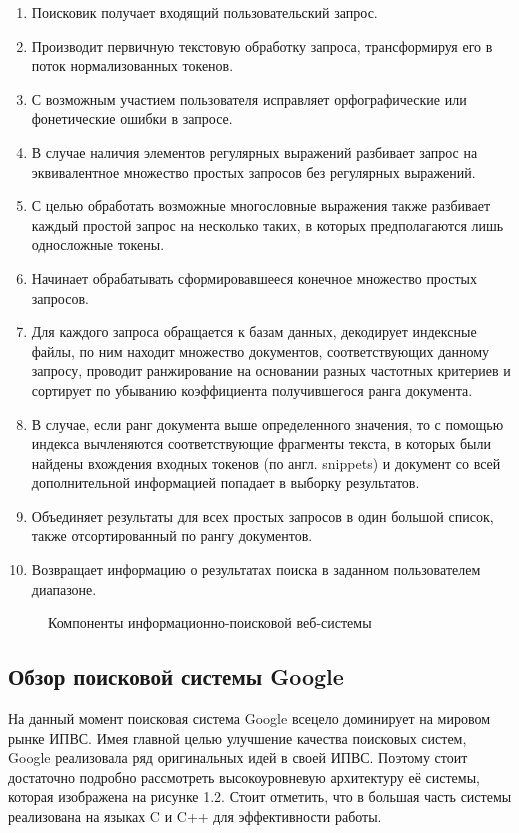 \begin{itemize}
\begin{enumerate}
\item Поисковик получает входящий пользовательский запрос.
\item Производит первичную текстовую обработку запроса, трансформируя его в поток нормализованных токенов.
\item С возможным участием пользователя исправляет орфографические или фонетические ошибки в запросе.
\item В случае наличия элементов регулярных выражений разбивает запрос на эквивалентное множество простых запросов без регулярных выражений.
\item С целью обработать возможные многословные выражения также разбивает каждый простой запрос на несколько таких, в которых предполагаются лишь односложные токены.
\item Начинает обрабатывать сформировавшееся конечное множество простых запросов.
\item Для каждого запроса обращается к базам данных, декодирует индексные файлы, по ним находит множество документов, соответствующих данному запросу, проводит ранжирование на основании разных частотных критериев и сортирует по убыванию коэффициента получившегося ранга документа.
\item В случае, если ранг документа выше определенного значения, то с помощью индекса вычленяются соответствующие фрагменты текста, в которых были найдены вхождения входных токенов (по англ. snippets) и документ со всей дополнительной информацией попадает в выборку результатов.
\item Объединяет результаты для всех простых запросов в один большой список, также отсортированный по рангу документов.
\item Возвращает информацию о результатах поиска в заданном пользователем диапазоне.
\end{enumerate}
\end{itemize}

\begin{figure}
\caption{Компоненты информационно-поисковой веб-системы}
\label{irws_comps:image}
\end{figure}

\subsection{Обзор поисковой системы Google}
На данный момент поисковая система Google всецело доминирует на мировом рынке ИПВС. Имея главной целью улучшение качества поисковых систем, Google реализовала ряд оригинальных идей в своей ИПВС. Поэтому стоит достаточно подробно рассмотреть высокоуровневую архитектуру её системы, которая изображена на рисунке 1.2. Стоит отметить, что в большая часть системы реализована на языках C и C++ для эффективности работы.


